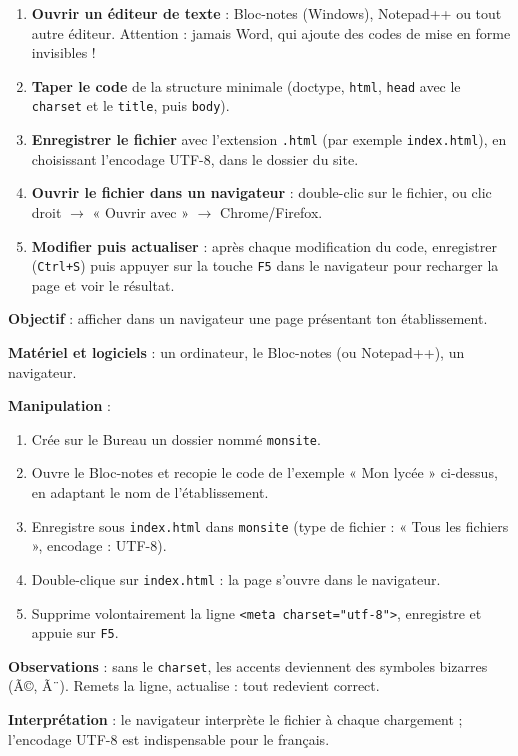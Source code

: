 \documentclass[11pt]{article}
\begin{document}
\begin{methode}
\begin{enumerate}
\item \textbf{Ouvrir un éditeur de texte} : Bloc-notes (Windows), Notepad++ ou tout autre éditeur. Attention : jamais Word, qui ajoute des codes de mise en forme invisibles !
\item \textbf{Taper le code} de la structure minimale (doctype, \texttt{html}, \texttt{head} avec le \texttt{charset} et le \texttt{title}, puis \texttt{body}).
\item \textbf{Enregistrer le fichier} avec l'extension \texttt{.html} (par exemple \texttt{index.html}), en choisissant l'encodage UTF-8, dans le dossier du site.
\item \textbf{Ouvrir le fichier dans un navigateur} : double-clic sur le fichier, ou clic droit $\to$ « Ouvrir avec » $\to$ Chrome/Firefox.
\item \textbf{Modifier puis actualiser} : après chaque modification du code, enregistrer (\texttt{Ctrl+S}) puis appuyer sur la touche \texttt{F5} dans le navigateur pour recharger la page et voir le résultat.
\end{enumerate}
\end{methode}

\begin{experience}
\textbf{Objectif} : afficher dans un navigateur une page présentant ton établissement.\par
\textbf{Matériel et logiciels} : un ordinateur, le Bloc-notes (ou Notepad++), un navigateur.\par
\textbf{Manipulation} :
\begin{enumerate}
\item Crée sur le Bureau un dossier nommé \texttt{monsite}.
\item Ouvre le Bloc-notes et recopie le code de l'exemple « Mon lycée » ci-dessus, en adaptant le nom de l'établissement.
\item Enregistre sous \texttt{index.html} dans \texttt{monsite} (type de fichier : « Tous les fichiers », encodage : UTF-8).
\item Double-clique sur \texttt{index.html} : la page s'ouvre dans le navigateur.
\item Supprime volontairement la ligne \texttt{<meta charset="utf-8">}, enregistre et appuie sur \texttt{F5}.
\end{enumerate}
\textbf{Observations} : sans le \texttt{charset}, les accents deviennent des symboles bizarres (Ã©, Ã¨). Remets la ligne, actualise : tout redevient correct.\par
\textbf{Interprétation} : le navigateur interprète le fichier à chaque chargement ; l'encodage UTF-8 est indispensable pour le français.
\end{experience}
\end{document}
